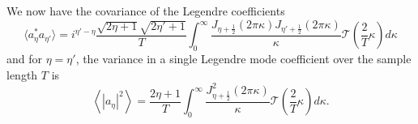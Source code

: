 \documentclass[10pt,preprint]{aastex631}
\begin{document}
We now have the covariance of the Legendre coefficients
\begin{equation}
\langle a_\eta^* a_{\eta'}\rangle = i^{\eta'-\eta} \frac{\sqrt{2\eta+1}\sqrt{2\eta'+1}}{T}   \int_{0}^{\infty} \frac{J_{\eta+\frac{1}{2}}(2\pi \kappa) J_{\eta'+\frac{1}{2}}(2\pi \kappa)}{\kappa} \mathcal{T}\left( \frac{2}{T} \kappa \right) d\kappa
\end{equation}
and for $\eta = \eta'$, the variance in a single Legendre mode coefficient over the sample length $T$ is
\begin{equation}
\left\langle \left|a_\eta\right|^2 \right\rangle = \frac{2\eta+1}{T}  \int_0^{\infty} \frac{ J_{\eta+\frac{1}{2}}^2(2\pi \kappa)}{\kappa} \mathcal{T}\left( \frac{2}{T} \kappa \right) d\kappa.
\label{eqn:varcoeff}
\end{equation}



\end{document}
